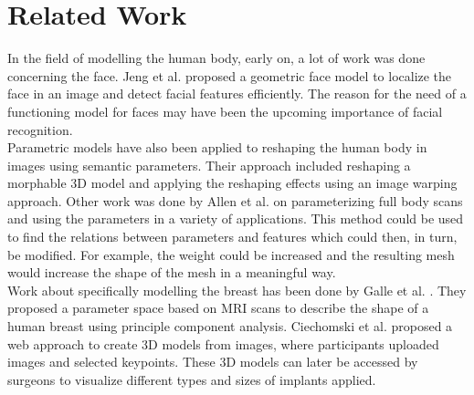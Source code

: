 \setcounter{chapter}{1}

\chapter{Related Work}
In the field of modelling the human body, early on, a lot of work was done concerning the face. Jeng et al. \cite{jeng1998facial} proposed a geometric face model to localize the face in an image and detect facial features efficiently. The reason for the need of a functioning model for faces may have been the upcoming importance of facial recognition.\\
Parametric models have also been applied to reshaping the human body in images using semantic parameters. \cite{zhou2010parametric} Their approach included reshaping a morphable 3D model and applying the reshaping effects using an image warping approach. Other work was done by Allen et al. \cite{allen2003space} on parameterizing full body scans and using the parameters in a variety of applications. This method could be used to find the relations between parameters and features which could then, in turn, be modified. For example, the weight could be increased and the resulting mesh would increase the shape of the mesh in a meaningful way.\\
Work about specifically modelling the breast has been done by Galle et al. \cite{gallo2010human}. They proposed a parameter space based on MRI scans to describe the shape of a human breast using principle component analysis. Ciechomski et al. \cite{de2012development} proposed a web approach to create 3D models from images, where participants uploaded images and selected keypoints. These 3D models can later be accessed by surgeons to visualize different types and sizes of implants applied.
